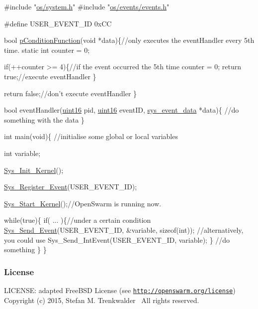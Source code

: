 \begin{DoxyCode}
\textcolor{preprocessor}{#include "\hyperlink{system_8h}{os/system.h}"}
\textcolor{preprocessor}{#include "\hyperlink{events_8h}{os/events/events.h}"}

\textcolor{preprocessor}{#define USER\_EVENT\_ID 0xCC}

\textcolor{keywordtype}{bool} \hyperlink{events_8h_a653a4a4b7d9f5a65e1415365267a9d9e}{pConditionFunction}(\textcolor{keywordtype}{void} *data)\{\textcolor{comment}{//only executes the eventHandler every 5th time.}
     \textcolor{keyword}{static} \textcolor{keywordtype}{int} counter = 0;

     \textcolor{keywordflow}{if}(++counter >= 4)\{\textcolor{comment}{//if the event occurred the 5th time}
         counter = 0;
         \textcolor{keywordflow}{return} \textcolor{keyword}{true};\textcolor{comment}{//execute eventHandler}
     \}

    \textcolor{keywordflow}{return} \textcolor{keyword}{false};\textcolor{comment}{//don't execute eventHandler}
\}

\textcolor{keywordtype}{bool} eventHandler(\hyperlink{definitions_8h_a05f6b0ae8f6a6e135b0e290c25fe0e4e}{uint16} pid, \hyperlink{definitions_8h_a05f6b0ae8f6a6e135b0e290c25fe0e4e}{uint16} eventID, \hyperlink{structsys__event__data}{sys\_event\_data} *data)\{
     \textcolor{comment}{//do something with the data}
\}

\textcolor{keywordtype}{int} main(\textcolor{keywordtype}{void})\{
 \textcolor{comment}{//initialise some global or local variables}

 \textcolor{keywordtype}{int} variable;

    \hyperlink{system_8c_a31ce626d506c2b262ecf5b23946f522f}{Sys\_Init\_Kernel}();

 \hyperlink{events_8c_a5d9657772509ddb7ac6f6e1aa5730308}{Sys\_Register\_Event}(USER\_EVENT\_ID);
     
 \hyperlink{system_8c_a2e15518324643f26cb240108259b30da}{Sys\_Start\_Kernel}();\textcolor{comment}{//OpenSwarm is running now.}
    
\textcolor{keywordflow}{while}(\textcolor{keyword}{true})\{
     \textcolor{keywordflow}{if}( ... )\{\textcolor{comment}{//under a certain condition}
          \hyperlink{events_8c_a67230a5307e77a8112e56436f372926f}{Sys\_Send\_Event}(USER\_EVENT\_ID, &variable, \textcolor{keyword}{sizeof}(\textcolor{keywordtype}{int}));
          \textcolor{comment}{//alternatively, you could use Sys\_Send\_IntEvent(USER\_EVENT\_ID, variable);}
     \}
     \textcolor{comment}{//do something}
    \}
\}
\end{DoxyCode}
\hypertarget{group__events_events_license}{}\subsubsection{License}\label{group__events_events_license}
L\+I\+C\+E\+N\+S\+E\+: adapted Free\+B\+S\+D License (see \href{http://openswarm.org/license}{\tt http\+://openswarm.\+org/license})~\newline
Copyright (c) 2015, Stefan M. Trenkwalder~\newline
All rights reserved. 